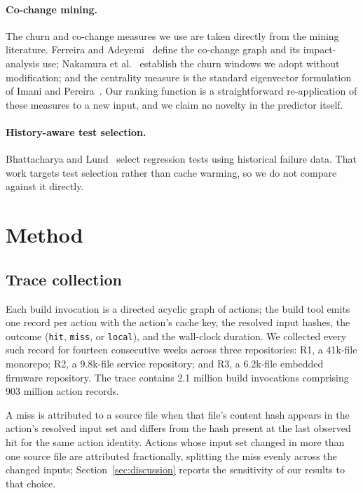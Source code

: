\documentclass{anvil-paper}
\begin{document}
\paragraph{Co-change mining.}
The churn and co-change measures we use are taken directly from the mining
literature. Ferreira and Adeyemi~\cite{ferreira2016cochange} define the
co-change graph and its impact-analysis use; Nakamura et
al.~\cite{nakamura2020churn} establish the churn windows we adopt without
modification; and the centrality measure is the standard eigenvector
formulation of Imani and Pereira~\cite{imani2017graphcentrality}. Our ranking
function is a straightforward re-application of these measures to a new input,
and we claim no novelty in the predictor itself.

\paragraph{History-aware test selection.}
Bhattacharya and Lund~\cite{bhattacharya2022testsel} select regression tests
using historical failure data. That work targets test selection rather than
cache warming, so we do not compare against it directly.

\section{Method}
\label{sec:method}

\subsection{Trace collection}

Each build invocation is a directed acyclic graph of actions; the build tool
emits one record per action with the action's cache key, the resolved input
hashes, the outcome (\texttt{hit}, \texttt{miss}, or \texttt{local}), and the
wall-clock duration. We collected every such record for fourteen consecutive
weeks across three repositories: R1, a 41k-file monorepo; R2, a 9.8k-file
service repository; and R3, a 6.2k-file embedded firmware repository. The
trace contains 2.1 million build invocations comprising 903 million action
records.

A miss is attributed to a source file when that file's content hash appears in
the action's resolved input set and differs from the hash present at the last
observed hit for the same action identity. Actions whose input set changed in
more than one source file are attributed fractionally, splitting the miss
evenly across the changed inputs; Section~\ref{sec:discussion} reports the
sensitivity of our results to that choice.
\end{document}
